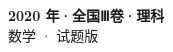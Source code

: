 \documentclass[zihao=-4, a4paper]{ctexart}
\begin{document}
\begin{center}
  {\Large\bfseries 2020 年·全国Ⅲ卷·理科}\\[4pt]
  {\large 数学 · 试题版}
\end{center}
\medskip
{}

\end{document}
